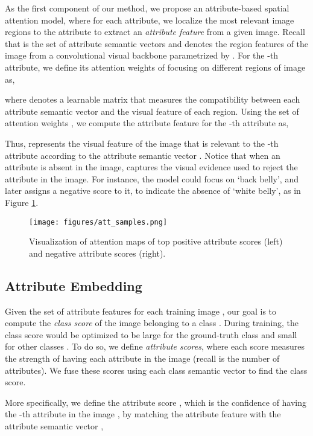 \documentclass[10pt,journal,compsoc]{IEEEtran}
\newcommand{\1}{\boldsymbol{1}}
\newcommand{\0}{\boldsymbol{0}}
\newcommand{\<}{\langle}
\renewcommand{\>}{\rangle}
\begin{document}
As the first component of our method, we propose an attribute-based spatial attention model, where for each attribute, we localize the most relevant image regions to the attribute to extract an \emph{attribute feature} from a given image.
Recall that  is the set of attribute semantic vectors and  denotes the region features of the image  from a convolutional visual backbone parametrized by . For the -th attribute, we define its attention weights of focusing on different regions of image  as,

where  denotes a learnable matrix that measures the compatibility between each attribute semantic vector and the visual feature of each region. Using the set of attention weights , we compute the attribute feature for the -th attribute as,

Thus,  represents the visual feature of the image  that is relevant to the -th attribute according to the attribute semantic vector . Notice that when an attribute is absent in the image,  captures the visual evidence used to reject the attribute in the image. For instance, the model could focus on `back belly', and later assigns a negative score to it, to indicate the absence of `white belly', as in Figure \ref{fig:att_samples}.

\begin{figure}[t!]
\centering
\texttt{[image: figures/att\_samples.png]}
\vspace{-0mm}
\caption{
\small{
Visualization of attention maps of top positive attribute scores (left) and negative attribute scores (right).
}
}
\vspace{-10pt}
\label{fig:att_samples}
\end{figure}


\subsection{Attribute Embedding}
Given the set of attribute features  for each training image , our goal is to compute the \emph{class score} of the image  belonging to a class . During training, the class score would be optimized to be large for the ground-truth class  and small for other classes . To do so, we define  \emph{attribute scores}, where each score measures the strength of having each attribute in the image (recall  is the number of attributes). We fuse these scores using each class semantic vector to find the class score.

More specifically, we define the attribute score , which is the confidence of having the -th attribute in the image , by matching the attribute feature  with the attribute semantic vector ,
\end{document}
